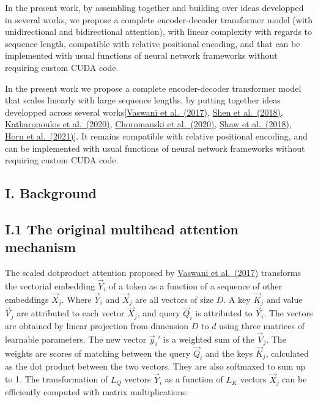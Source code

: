 In the present work, by assembling together and building over ideas
developped in several works, we propose a complete encoder-decoder
transformer model (with unidirectional and bidirectional attention),
with linear complexity with regards to sequence length, compatible with
relative positional encoding, and that can be implemented with usual
functions of neural network frameworks without requiring custom CUDA
code.

In the present work we propose a complete encoder-decoder transformer
model that scales linearly with large sequence lengths, by putting
together ideas developped across several
works{[}\href{https://arxiv.org/abs/1706.03762}{Vaswani et al.~(2017)},
\href{https://arxiv.org/abs/1812.01243}{Shen et al.~(2018)},
\href{https://arxiv.org/abs/2006.16236}{Katharopoulos et al.~(2020)},
\href{https://arxiv.org/abs/2009.14794}{Choromanski et al.~(2020)},
\href{https://arxiv.org/abs/1803.02155}{Shaw et al.~(2018)},
\href{https://arxiv.org/abs/2102.07680}{Horn et al.~(2021)}{]}. It
remains compatible with relative positional encoding, and can be
implemented with usual functions of neural network frameworks without
requiring custom CUDA code.

\hypertarget{i.-background}{%
\subsection{I. Background}\label{i.-background}}

\hypertarget{i.1-the-original-multihead-attention-mechanism}{%
\subsection{I.1 The original multihead attention
mechanism}\label{i.1-the-original-multihead-attention-mechanism}}

The scaled dotproduct attention proposed by
\href{https://arxiv.org/abs/1706.03762}{Vaswani et al.~(2017)}
transforms the vectorial embedding \(\vec{Y}_i\) of a token as a
function of a sequence of other embeddings \(\vec{X}_j\). Where
\(\vec{Y}_i\) and \(\vec{X}_j\) are all vectors of size \(D\). A key
\(\vec{K}_j\) and value \(\vec{V}_j\) are attributed to each vector
\(\vec{X}_j\), and query \(\vec{Q}_i\) is attributed to \(\vec{Y}_i\).
The vectors are obtained by linear projection from dimension \(D\) to
\(d\) using three matrices of learnable parameters. The new vector
\(\vec{y}_i'\) is a weighted sum of the \(\vec{V}_j\). The weights are
scores of matching between the query \(\vec{Q}_i\) and the keys
\(\vec{K}_j\), calculated as the dot product between the two vectors.
They are also softmaxed to sum up to 1. The transformation of \(L_Q\)
vectors \(\vec{Y}_i\) as a function of \(L_K\) vectors \(\vec{X}_j\) can
be efficiently computed with matrix multiplications:

